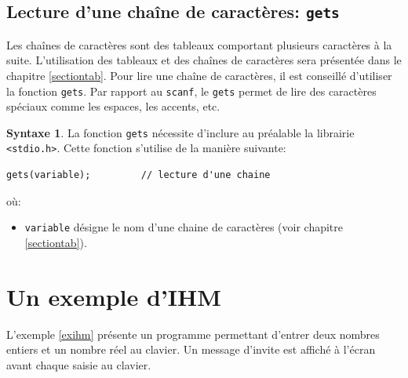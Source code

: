 \documentclass[a4paper,11pt]{book}
\theoremstyle{definition}
\newtheorem*{syntaxe}{Syntaxe}
\begin{document}


\subsection{Lecture d'une chaîne de caractères: \texttt{gets}}
Les chaînes de caractères sont des tableaux comportant plusieurs
caractères à la suite. L'utilisation des tableaux et des chaînes de
caractères sera présentée dans le chapitre \ref{sectiontab}. Pour
lire une chaîne de caractères, il est conseillé d'utiliser la
fonction \texttt{gets}. Par rapport au \texttt{scanf}, le
\texttt{gets} permet de lire des caractères spéciaux comme les
espaces, les accents, etc.
\begin{syntaxe}La fonction \texttt{gets} nécessite d'inclure au préalable la librairie
\texttt{<stdio.h>}. Cette fonction s'utilise de la manière suivante:
\begin{lstlisting}
gets(variable);         // lecture d'une chaine
\end{lstlisting}
où:
\begin{itemize}
\item \texttt{variable} désigne le nom d'une chaine de caractères (voir chapitre \ref{sectiontab}).
\end{itemize}
\end{syntaxe}

\section{Un exemple d'IHM}

L'exemple \ref{exihm} présente un programme permettant d'entrer deux nombres entiers et un nombre réel au clavier. Un message d'invite est affiché à l'écran avant chaque saisie au clavier.


\end{document}
